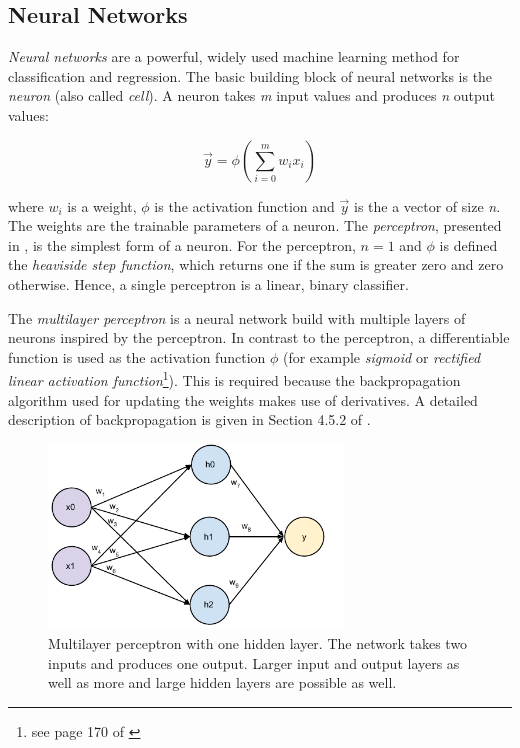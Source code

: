 \subsection{Neural Networks}
\emph{Neural networks} are a powerful, widely used machine learning method for classification and regression. The basic building block of neural networks is the \emph{neuron} (also called \emph{cell}). A neuron takes \emph{m} input values and produces \emph{n} output values:

\[ \vec{y} = \phi \left( \sum^m_{i=0} w_ix_i \right) \]

where $w_i$ is a weight, $\phi$ is the activation function and $\vec{y}$ is the a vector of size \emph{n}. The weights are the trainable parameters of a neuron. The \emph{perceptron}, presented in \cite{rosenblatt1958perceptron}, is the simplest form of a neuron. For the perceptron, $n=1$ and $\phi$ is defined the \emph{heaviside step function}, which returns one if the sum is greater zero and zero otherwise. Hence, a single perceptron is a linear, binary classifier.

The \emph{multilayer perceptron} is a neural network build with multiple layers of neurons inspired by the perceptron. In contrast to the perceptron, a differentiable function is used as the activation function $\phi$ (for example \emph{sigmoid} or  \emph{rectiﬁed linear activation function}\footnote{see page 170 of \cite{Goodfellow-et-al-2016}}). This is required because the backpropagation algorithm used for updating the weights makes use of derivatives. A detailed description of backpropagation is given in Section 4.5.2 of \cite{mitchell1997machine}.





\begin{figure}[ht]
\centering
	\includegraphics[width=0.7\textwidth]{images/nn}
	\caption{Multilayer perceptron with one hidden layer. The network takes two inputs and produces one output. Larger input and output layers as well as more and large hidden layers are possible as well.}
		\label{fig:nn}
\end{figure}   


